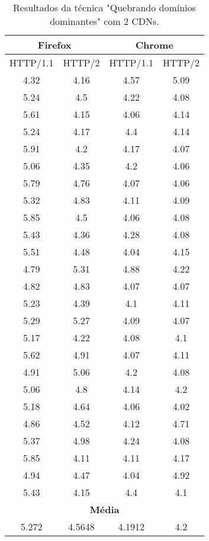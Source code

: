 \begin{table}[h]
	\centering
	\caption{Resultados da técnica "Quebrando domínios dominantes" com 2 CDNs.}
	\label{resultados-quebrandodominiosdominantes-2}
	\begin{tabular}{cccc}
		\hline
		\multicolumn{2}{c}{\textbf{Firefox}} & \multicolumn{2}{c}{\textbf{Chrome}} \\
		\hline
		HTTP/1.1 & HTTP/2 & HTTP/1.1 & HTTP/2 \\
		\hline
		4.32 & 4.16 & 4.57 & 5.09 \\
		5.24 & 4.5 & 4.22 & 4.08 \\
		5.61 & 4.15 & 4.06 & 4.14 \\
		5.24 & 4.17 & 4.4 & 4.14 \\
		5.91 & 4.2 & 4.17 & 4.07 \\
		5.06 & 4.35 & 4.2 & 4.06 \\
		5.79 & 4.76 & 4.07 & 4.06 \\
		5.32 & 4.83 & 4.11 & 4.09 \\
		5.85 & 4.5 & 4.06 & 4.08 \\
		5.43 & 4.36 & 4.28 & 4.08 \\
		5.51 & 4.48 & 4.04 & 4.15 \\
		4.79 & 5.31 & 4.88 & 4.22 \\
		4.82 & 4.83 & 4.07 & 4.07 \\
		5.23 & 4.39 & 4.1 & 4.11 \\
		5.29 & 5.27 & 4.09 & 4.07 \\
		5.17 & 4.22 & 4.08 & 4.1 \\
		5.62 & 4.91 & 4.07 & 4.11 \\
		4.91 & 5.06 & 4.2 & 4.08 \\
		5.06 & 4.8 & 4.14 & 4.2 \\
		5.18 & 4.64 & 4.06 & 4.02 \\
		4.86 & 4.52 & 4.12 & 4.71 \\
		5.37 & 4.98 & 4.24 & 4.08 \\
		5.85 & 4.11 & 4.11 & 4.17 \\
		4.94 & 4.47 & 4.04 & 4.92 \\
		5.43 & 4.15 & 4.4 & 4.1 \\
		\hline
		\multicolumn{4}{c}{\textbf{Média}} \\
		5.272 & 4.5648 & 4.1912 & 4.2 \\
		\hline
	\end{tabular}
\end{table}